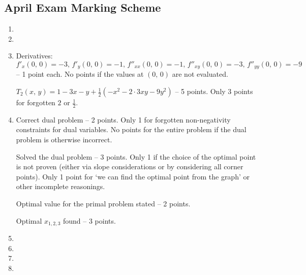 \subsection{April Exam Marking Scheme}
\begin{enumerate}
  \item %
  \item %
  \item %
      Derivatives: $f'_x(0,\,0)=-3,\,f'_y(0,\,0)=-1,\,f''_{xx}(0,\,0)=-1,\,f''_{xy}(0,\,0)=-3,\,f''_{yy}(0,\,0)=-9$ -- 1 point each. No points if the values at $(0,\,0)$ are not evaluated.
      
      $T_2(x,\,y)=1-3x-y+\frac12(-x^2-2\cdot3xy-9y^2)$ -- 5 points. Only 3 points for forgotten $2$ or $\frac12$.
  \item %
      Correct dual problem -- 2 points. Only 1 for forgotten non-negativity constraints for dual variables. No points for the entire problem if the dual problem is otherwise incorrect.
      
      Solved the dual problem -- 3 points. Only 1 if the choice of the optimal point is not proven (either via slope considerations or by considering all corner points). Only 1 point for `we can find the optimal point from the graph' or other incomplete reasonings.
      
      Optimal value for the primal problem stated -- 2 points.
      
      Optimal $x_{1,2,3}$ found -- 3 points.
  \item %
  \item %
  \item %
  \item %
\end{enumerate}